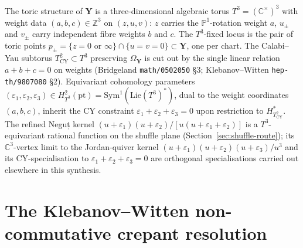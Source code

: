 \documentclass[11pt]{amsart}
\theoremstyle{definition}
\providecommand{\bY}{\mathbf{Y}}
\providecommand{\bZ}{\mathbb{Z}}
\providecommand{\bC}{\mathbb{C}}
\providecommand{\bP}{\mathbb{P}}
\begin{document}
The toric structure of $\bY$ is a three-dimensional algebraic torus
$T^3 = (\bC^\times)^3$ with weight data $(a, b, c) \in \bZ^3$ on
$(z, u, v)$: $z$ carries the $\bP^1$-rotation weight $a$, $u_\pm$ and $v_\pm$
carry independent fibre weights $b$ and $c$. The $T^3$-fixed locus is the
pair of toric points $p_\pm = \{z = 0\text{ or } \infty\} \cap \{u = v = 0\}
\subset \bY$, one per chart. The Calabi--Yau subtorus
$T^2_{\mathrm{CY}} \subset T^3$ preserving $\Omega_{\bY}$ is cut out by the
single linear relation $a + b + c = 0$ on weights (Bridgeland
\texttt{math/0502050} §3; Klebanov--Witten \texttt{hep-th/9807080} §2).
Equivariant cohomology parameters
$(\varepsilon_1, \varepsilon_2, \varepsilon_3) \in H^2_{T^3}(\mathrm{pt}) =
\mathrm{Sym}^1(\mathrm{Lie}(T^3)^*)$, dual to the weight coordinates $(a,b,c)$,
inherit the CY constraint $\varepsilon_1 + \varepsilon_2 + \varepsilon_3 = 0$
upon restriction to $H^*_{T^2_{\mathrm{CY}}}$. The refined Neguț kernel
$(u+\varepsilon_1)(u+\varepsilon_2)/[u(u+\varepsilon_1+\varepsilon_2)]$ is a
$T^3$-equivariant rational function on the shuffle plane
(Section~\ref{sec:shuffle-route}); its $\bC^3$-vertex limit to the
Jordan-quiver kernel $(u+\varepsilon_1)(u+\varepsilon_2)(u+\varepsilon_3)/u^3$
and its CY-specialisation to $\varepsilon_1+\varepsilon_2+\varepsilon_3 = 0$
are orthogonal specialisations carried out elsewhere in this synthesis.

\section{The Klebanov--Witten non-commutative crepant resolution}
\end{document}
